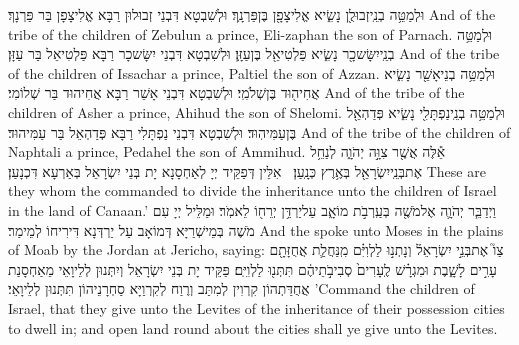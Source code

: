 {וּלְמַטֵּ֥ה בְנֵֽי\maqqaf זְבוּלֻ֖ן נָשִׂ֑יא אֱלִיצָפָ֖ן בֶּן\maqqaf פַּרְנָֽךְ׃}
{וּלְשִׁבְטָא דִּבְנֵי זְבוּלוּן רַבָּא אֱלִיצָפָן בַּר פַּרְנָךְ׃}
{And of the tribe of the children of Zebulun a prince, Eli-zaphan the son of Parnach.}{}
{וּלְמַטֵּ֥ה בְנֵֽי\maqqaf יִשָּׂשכָ֖ר נָשִׂ֑יא פַּלְטִיאֵ֖ל בֶּן\maqqaf עַזָּֽן׃}
{וּלְשִׁבְטָא דִּבְנֵי יִשָּׂשכָר רַבָּא פַּלְטִיאֵל בַּר עַזָּן׃}
{And of the tribe of the children of Issachar a prince, Paltiel the son of Azzan.}{}
{וּלְמַטֵּ֥ה בְנֵי\maqqaf אָשֵׁ֖ר נָשִׂ֑יא אֲחִיה֖וּד בֶּן\maqqaf שְׁלֹמִֽי׃}
{וּלְשִׁבְטָא דִּבְנֵי אָשֵׁר רַבָּא אֲחִיהוּד בַּר שְׁלוֹמִי׃}
{And of the tribe of the children of Asher a prince, Ahihud the son of Shelomi.}{}
{וּלְמַטֵּ֥ה בְנֵֽי\maqqaf נַפְתָּלִ֖י נָשִׂ֑יא פְּדַהְאֵ֖ל בֶּן\maqqaf עַמִּיהֽוּד׃}
{וּלְשִׁבְטָא דִּבְנֵי נַפְתָּלִי רַבָּא פְּדַהְאֵל בַּר עַמִּיהוּד׃}
{And of the tribe of the children of Naphtali a prince, Pedahel the son of Ammihud.}{}
{אֵ֕לֶּה אֲשֶׁ֖ר צִוָּ֣ה יְהֹוָ֑ה לְנַחֵ֥ל אֶת\maqqaf בְּנֵֽי\maqqaf יִשְׂרָאֵ֖ל בְּאֶ֥רֶץ כְּנָֽעַן׃ \petucha }
{אִלֵּין דְּפַקֵּיד יְיָ לְאַחְסָנָא יָת בְּנֵי יִשְׂרָאֵל בְּאַרְעָא דִּכְנָעַן׃}
{These are they whom the \lord\space commanded to divide the inheritance unto the children of Israel in the land of Canaan.’}{}
\newperek
{}%
{וַיְדַבֵּ֧ר יְהֹוָ֛ה אֶל\maqqaf מֹשֶׁ֖ה בְּעַֽרְבֹ֣ת מוֹאָ֑ב עַל\maqqaf יַרְדֵּ֥ן יְרֵח֖וֹ לֵאמֹֽר׃}
{וּמַלֵּיל יְיָ עִם מֹשֶׁה בְּמֵישְׁרַיָּא דְּמוֹאָב עַל יַרְדְּנָא דִּירִיחוֹ לְמֵימַר׃}
{And the \lord\space spoke unto Moses in the plains of Moab by the Jordan at Jericho, saying:}{}
{צַו֮ אֶת\maqqaf בְּנֵ֣י יִשְׂרָאֵל֒ וְנָתְנ֣וּ לַלְוִיִּ֗ם מִֽנַּחֲלַ֛ת אֲחֻזָּתָ֖ם עָרִ֣ים לָשָׁ֑בֶת וּמִגְרָ֗שׁ לֶֽעָרִים֙ סְבִיבֹ֣תֵיהֶ֔ם תִּתְּנ֖וּ לַלְוִיִּֽם׃}
{פַּקֵּיד יָת בְּנֵי יִשְׂרָאֵל וְיִתְּנוּן לְלֵיוָאֵי מֵאַחְסָנַת אֲחֻדַּתְהוֹן קִרְוִין לְמִתַּב וְרֶוַח לְקִרְוַיָּא סַחְרָנֵיהוֹן תִּתְּנוּן לְלֵיוָאֵי׃}
{’Command the children of Israel, that they give unto the Levites of the inheritance of their possession cities to dwell in; and open land round about the cities shall ye give unto the Levites.}{}
